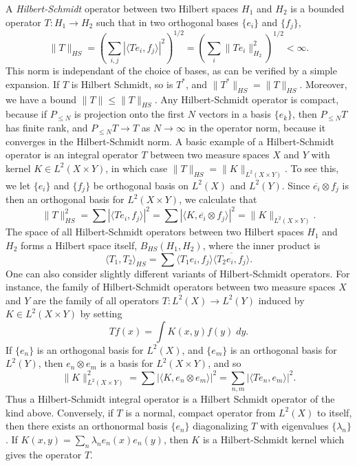 \begin{example}
    A \emph{Hilbert-Schmidt} operator between two Hilbert spaces $H_1$ and $H_2$ is a bounded operator $T: H_1 \to H_2$ such that in two orthogonal bases $\{ e_i \}$ and $\{ f_j \}$,
    \[ \| T \|_{HS} = \left( \sum_{i,j} |\langle Te_i, f_j \rangle|^2 \right)^{1/2} = \left( \sum_i \| Te_i \|^2_{H_2} \right)^{1/2} < \infty. \]
    This norm is independant of the choice of bases, as can be verified by a simple expansion. If $T$ is Hilbert Schmidt, so is $T^*$, and $\| T^* \|_{HS} = \| T \|_{HS}$. Moreover, we have a bound $\| T \| \leq \| T \|_{HS}$. Any Hilbert-Schmidt operator is compact, because if $P_{\leq N}$ is projection onto the first $N$ vectors in a basis $\{ e_k \}$, then $P_{\leq N} T$ has finite rank, and $P_{\leq N} T \to T$ as $N \to \infty$ in the operator norm, because it converges in the Hilbert-Schmidt norm. A basic example of a Hilbert-Schmidt operator is an integral operator $T$ between two measure spaces $X$ and $Y$ with kernel $K \in L^2(X \times Y)$, in which case $\| T \|_{HS} = \| K \|_{L^2(X \times Y)}$. To see this, we let $\{ e_i \}$ and $\{ f_j \}$ be orthogonal basis on $L^2(X)$ and $L^2(Y)$. Since $\overline{e_i} \otimes f_j$ is then an orthogonal basis for $L^2(X \times Y)$, we calculate that
    \[ \| T \|_{HS}^2 = \sum |\langle Te_i, f_j \rangle|^2 = \sum |\langle K, \overline{e_i} \otimes f_j \rangle|^2 = \| K \|_{L^2(X \times Y)}. \]
    The space of all Hilbert-Schmidt operators between two Hilbert spaces $H_1$ and $H_2$ forms a Hilbert space itself, $B_{HS}(H_1,H_2)$, where the inner product is
    \[ \langle T_1, T_2 \rangle_{HS} = \sum \langle T_1e_i, f_j \rangle \overline{\langle T_2 e_i, f_j \rangle}. \]
    One can also consider slightly different variants of Hilbert-Schmidt operators. For instance, the family of Hilbert-Schmidt operators between two measure spaces $X$ and $Y$ are the family of all operators $T: L^2(X) \to L^2(Y)$ induced by $K \in L^2(X \times Y)$ by setting
    \[ Tf(x) = \int K(x,y) f(y)\; dy. \]
    If $\{ e_n \}$ is an orthogonal basis for $L^2(X)$, and $\{ e_m \}$ is an orthogonal basis for $L^2(Y)$, then $e_n \otimes e_m$ is a basis for $L^2(X \times Y)$, and so
    \[ \| K \|_{L^2(X \times Y)}^2 = \sum |\langle K, e_n \otimes e_m \rangle|^2 = \sum_{n,m} |\langle Te_n, e_m \rangle|^2. \]
    Thus a Hilbert-Schmidt integral operator is a Hilbert Schmidt operator of the kind above. Conversely, if $T$ is a normal, compact operator from $L^2(X)$ to itself, then there exists an orthonormal basis $\{ e_n \}$ diagonalizing $T$ with eigenvalues $\{ \lambda_n \}$. If $K(x,y) = \sum_n \lambda_n e_n(x) e_n(y)$, then $K$ is a Hilbert-Schmidt kernel which gives the operator $T$. 
\end{example}

